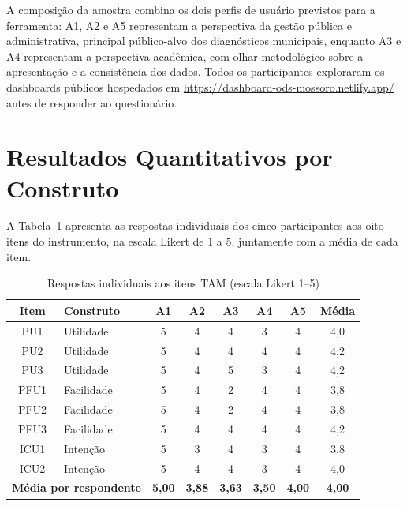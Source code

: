 A composição da amostra combina os dois perfis de usuário previstos para a ferramenta: A1, A2 e A5 representam a perspectiva da gestão pública e administrativa, principal público-alvo dos diagnósticos municipais, enquanto A3 e A4 representam a perspectiva acadêmica, com olhar metodológico sobre a apresentação e a consistência dos dados. Todos os participantes exploraram os dashboards públicos hospedados em \url{https://dashboard-ods-mossoro.netlify.app/} antes de responder ao questionário.

\section{Resultados Quantitativos por Construto}
\label{sec:resultados-tam}

A Tabela~\ref{tab:respostas-tam} apresenta as respostas individuais dos cinco participantes aos oito itens do instrumento, na escala Likert de 1 a 5, juntamente com a média de cada item.

\begin{table}[h!]
    \centering
    \caption{Respostas individuais aos itens TAM (escala Likert 1--5)}
    \label{tab:respostas-tam}
    \begin{tabular}{clcccccc}
        \hline
        \textbf{Item} & \textbf{Construto} & \textbf{A1} & \textbf{A2} & \textbf{A3} & \textbf{A4} & \textbf{A5} & \textbf{Média} \\
        \hline
        PU1  & Utilidade  & 5 & 4 & 4 & 3 & 4 & 4,0 \\
        PU2  & Utilidade  & 5 & 4 & 4 & 4 & 4 & 4,2 \\
        PU3  & Utilidade  & 5 & 4 & 5 & 3 & 4 & 4,2 \\
        PFU1 & Facilidade & 5 & 4 & 2 & 4 & 4 & 3,8 \\
        PFU2 & Facilidade & 5 & 4 & 2 & 4 & 4 & 3,8 \\
        PFU3 & Facilidade & 5 & 4 & 4 & 4 & 4 & 4,2 \\
        ICU1 & Intenção   & 5 & 3 & 4 & 3 & 4 & 3,8 \\
        ICU2 & Intenção   & 5 & 4 & 4 & 3 & 4 & 4,0 \\
        \hline
        \multicolumn{2}{l}{\textbf{Média por respondente}} & \textbf{5,00} & \textbf{3,88} & \textbf{3,63} & \textbf{3,50} & \textbf{4,00} & \textbf{4,00} \\
        \hline
    \end{tabular}
\end{table}

